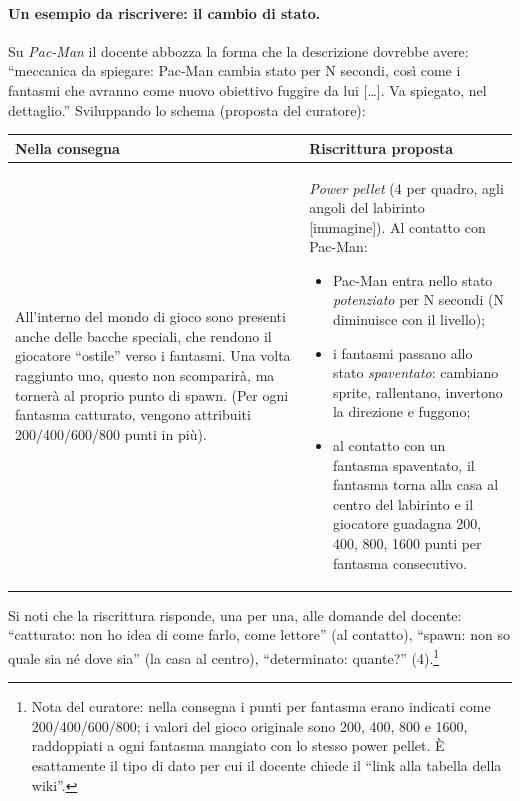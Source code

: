 \paragraph{Un esempio da riscrivere: il cambio di stato.} Su \emph{Pac-Man}
il docente abbozza la forma che la descrizione dovrebbe avere: ``meccanica da
spiegare: Pac-Man cambia stato per N secondi, così come i fantasmi che
avranno come nuovo obiettivo fuggire da lui [\dots]. Va spiegato, nel
dettaglio.'' Sviluppando lo schema (proposta del curatore):

\begin{center}
\small
\begin{tabular}{@{}p{}p{}@{}}
  \toprule
  \textbf{Nella consegna} & \textbf{Riscrittura proposta} \\
  \midrule
  All'interno del mondo di gioco sono presenti anche delle bacche speciali,
  che rendono il giocatore ``ostile'' verso i fantasmi. Una volta raggiunto
  uno, questo non scomparirà, ma tornerà al proprio punto di spawn. (Per
  ogni fantasma catturato, vengono attribuiti 200/400/600/800 punti in più).
  &
  \emph{Power pellet} (4 per quadro, agli angoli del labirinto
  [immagine]). Al contatto con Pac-Man:
  \begin{itemize}
    \item Pac-Man entra nello stato \emph{potenziato} per N secondi (N
          diminuisce con il livello);
    \item i fantasmi passano allo stato \emph{spaventato}: cambiano sprite,
          rallentano, invertono la direzione e fuggono;
    \item al contatto con un fantasma spaventato, il fantasma torna alla
          casa al centro del labirinto e il giocatore guadagna 200, 400,
          800, 1600 punti per fantasma consecutivo.
  \end{itemize} \\
  \bottomrule
\end{tabular}
\end{center}

\noindent Si noti che la riscrittura risponde, una per una, alle domande del
docente: ``catturato: non ho idea di come farlo, come lettore'' (al
contatto), ``spawn: non so quale sia né dove sia'' (la casa al centro),
``determinato: quante?'' (4).\footnote{Nota del curatore: nella consegna i
punti per fantasma erano indicati come 200/400/600/800; i valori del gioco
originale sono 200, 400, 800 e 1600, raddoppiati a ogni fantasma mangiato con
lo stesso power pellet. È esattamente il tipo di dato per cui il docente
chiede il ``link alla tabella della wiki''.}

